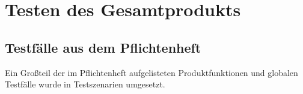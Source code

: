 \documentclass[parskip=full]{scrartcl}
\begin{document}
\newpage
\section{Testen des Gesamtprodukts}\label{gesamthwsw}

%

\subsection{Testfälle aus dem Pflichtenheft}
Ein Großteil der im Pflichtenheft aufgelisteten Produktfunktionen und globalen Testfälle wurde in Testszenarien umgesetzt. 
\end{document}
